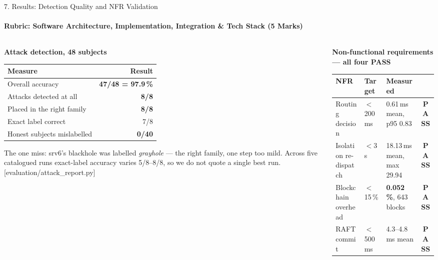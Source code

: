 \documentclass[aspectratio=169, 11pt]{beamer}
\newcommand{\rubric}[1]{Rubric: #1}
\newcommand{\src}[1]{{\color{gray}\tiny [#1]}}
\begin{document}
\begin{frame}{7. Results: Detection Quality and NFR Validation}
    \framesubtitle{\rubric{Software Architecture, Implementation, Integration \& Tech Stack (5 Marks)}}
    \begin{columns}[T]
      \begin{column}{0.46\textwidth}
        \centering\tiny
        \textbf{Attack detection, 48 subjects}\\[3pt]
        \begin{tabular}{@{}lr@{}}
          \toprule
          \textbf{Measure} & \textbf{Result}\\
          \midrule
          Overall accuracy            & \textbf{47/48 = 97.9\,\%}\\
          Attacks detected at all     & \textbf{8/8}\\
          Placed in the right family  & \textbf{8/8}\\
          Exact label correct         & 7/8\\
          Honest subjects mislabelled & \textbf{0/40}\\
          \bottomrule
        \end{tabular}

        \vspace{3pt}
        \raggedright\tiny
        The one miss: srv6's blackhole was labelled \emph{grayhole} --- the right
        family, one step too mild. Across five catalogued runs exact-label
        accuracy varies 5/8--8/8, so we do not quote a single best run.
        \src{evaluation/attack\_report.py}
      \end{column}
      \begin{column}{0.54\textwidth}
        \centering\tiny
        \textbf{Non-functional requirements --- all four PASS}\\[3pt]
        \begin{tabular}{@{}lllc@{}}
          \toprule
          \textbf{NFR} & \textbf{Target} & \textbf{Measured} & \\
          \midrule
          Routing decision   & $<$200\,ms   & 0.61\,ms mean, p95 0.83 & \textbf{PASS}\\
          Isolation re-dispatch & $<$3\,s   & 18.13\,ms mean, max 29.94 & \textbf{PASS}\\
          Blockchain overhead & $<$15\,\%   & \textbf{0.052\,\%}, 643 blocks & \textbf{PASS}\\
          RAFT commit        & $<$500\,ms   & 4.3--4.8\,ms mean & \textbf{PASS}\\
          \bottomrule
        \end{tabular}


\end{column}
\end{columns}
\end{frame}
\end{document}
